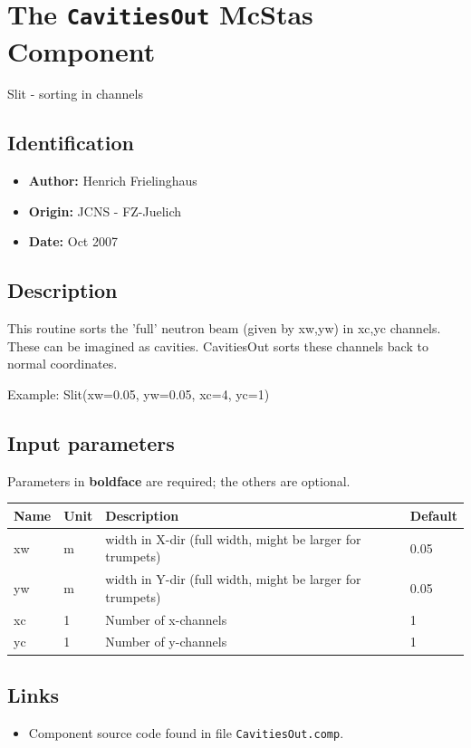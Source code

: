 \section{The \texttt{CavitiesOut} McStas Component}
Slit - sorting in channels

\subsection*{Identification}
\begin{itemize}
  \item \textbf{Author:} Henrich Frielinghaus
  \item \textbf{Origin:} JCNS - FZ-Juelich
  \item \textbf{Date:} Oct 2007
\end{itemize}

\subsection*{Description}
This routine sorts the 'full' neutron beam (given by xw,yw) in xc,yc channels. These can be imagined as cavities. CavitiesOut sorts these channels back to normal coordinates.

Example: Slit(xw=0.05, yw=0.05, xc=4, yc=1)

\subsection*{Input parameters}
Parameters in \textbf{boldface} are required; the others are optional.

\begin{longtable}{p{}p{}p{}p{}}
\toprule
\textbf{Name} & \textbf{Unit} & \textbf{Description} & \textbf{Default} \\
\midrule
\endhead
xw & m & width in X-dir (full width, might be larger for trumpets) & 0.05 \\
yw & m & width in Y-dir (full width, might be larger for trumpets) & 0.05 \\
xc & 1 & Number of x-channels & 1 \\
yc & 1 & Number of y-channels & 1 \\
\bottomrule
\end{longtable}

\subsection*{Links}
\begin{itemize}
  \item Component source code found in file \texttt{CavitiesOut.comp}.
\end{itemize}
